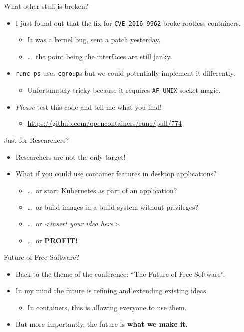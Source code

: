 \documentclass[10pt,aspectratio=169]{beamer}
\begin{document}
	\begin{frame}{What other stuff is broken?}
		\begin{itemize}
			\item I just found out that the fix for \texttt{CVE-\@2016-\@9962} broke rootless containers.
			\begin{itemize}
				\item It was a kernel bug, sent a patch yesterday.
				\item \dots~the point being the interfaces are still janky.
			\end{itemize}
			\item \texttt{runc ps} uses \texttt{cgroup}s but we could potentially implement it differently.
			\begin{itemize}
				\item Unfortunately tricky because it requires \texttt{AF\_UNIX} socket magic.
			\end{itemize}
			\item \textit{Please} test this code and tell me what you find!
			\begin{itemize}
				\item \underline{\url{https://github.com/opencontainers/runc/pull/774}}
			\end{itemize}
		\end{itemize}
	\end{frame}

	\begin{frame}{Just for Researchers?}
		\begin{itemize}
			\item Researchers are not the only target!
			\item What if you could use container features in desktop applications?
			\begin{itemize}
				\item \dots~or start Kubernetes as part of an application?
				\item \dots~or build images in a build system without privileges?
				\item \dots~or \textit{<insert your idea here>}
				\item \dots~or \textbf{PROFIT!}
			\end{itemize}
		\end{itemize}
	\end{frame}

	\begin{frame}{Future of Free Software?}
		\begin{itemize}
			\item Back to the theme of the conference: ``The Future of Free Software''.
			\item In my mind the future is refining and extending existing ideas.
			\begin{itemize}
				\item In containers, this is allowing everyone to use them.
			\end{itemize}
			\item But more importantly, the future is \textbf{what we make it}.
		\end{itemize}
	\end{frame}
\end{document}

